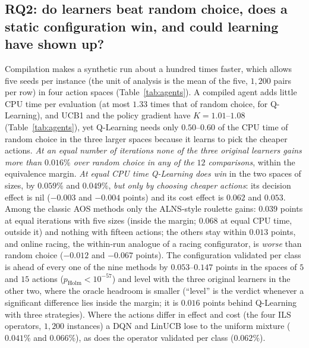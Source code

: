 \documentclass[conference,a4paper]{IEEEtran}
\begin{document}


\subsection{RQ2: do learners beat random choice, does a static configuration win, and could learning have shown up?}
\label{sec:rq2}
Compilation makes a synthetic run about a hundred times faster, which allows five seeds per instance (the unit of analysis is the mean of the five, $1{,}200$ pairs per row) in four action spaces
(Table~\ref{tab:agents}). A compiled agent adds little CPU time per evaluation (at most $1.33$ times that of random choice, for Q-Learning), and UCB1 and the policy gradient have $K=1.01$--$1.08$ (Table~\ref{tab:agents}), yet Q-Learning needs
only $0.50$--$0.60$ of the CPU time of random choice in the three larger spaces because it learns to pick the cheaper actions. \emph{At an equal number of iterations none of the three original learners
gains more than $0.016\%$ over random choice in any of the $12$ comparisons}, within the equivalence margin.
\emph{At equal CPU time Q-Learning does win} in the two spaces of sizes, by $0.059\%$ and $0.049\%$, \emph{but only by choosing cheaper actions}: its decision effect is nil ($-0.003$ and $-0.004$ points) and its cost effect is $0.062$ and $0.053$. Among the classic AOS methods only the ALNS-style roulette gains: $0.039$ points at equal iterations with five sizes
(inside the margin; $0.068$ at equal CPU time, outside it) and nothing with fifteen actions; the others stay within $0.013$ points, and online racing, the within-run analogue of a racing configurator, is \emph{worse} than random choice ($-0.012$ and $-0.067$ points).
The configuration validated per class is ahead of every one of the nine methods by $0.053$--$0.147$ points in the spaces of $5$ and $15$ actions ($p_{\mathrm{Holm}}<10^{-57}$)
and level with the three original learners in the other two, where the oracle headroom is smaller (``level'' is the verdict whenever a significant difference lies inside the margin; it is $0.016$ points behind Q-Learning with three strategies). Where the actions differ in effect and cost (the four ILS operators, $1{,}200$ instances) a DQN and LinUCB lose to the uniform mixture ($0.041\%$ and $0.066\%$), as does the operator validated per class ($0.062\%$).
\end{document}
